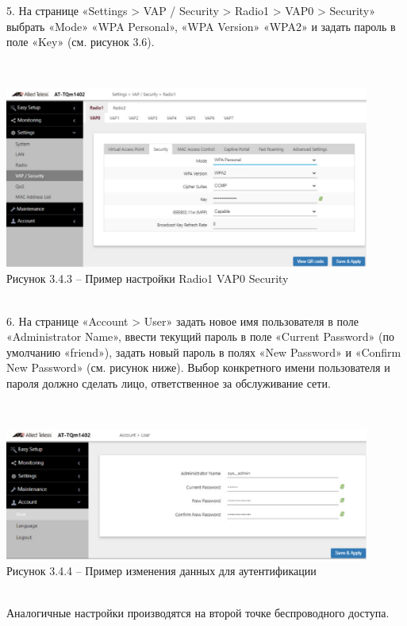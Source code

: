     5. На странице «Settings > VAP / Security > Radio1 > VAP0 > Security» выбрать «Mode» «WPA Personal»,
    «WPA Version» «WPA2» и задать пароль в поле «Key» (см. рисунок 3.6).

    \\
    \begin{center}
        \includegraphics[width=0.9\textwidth]{images/point3}\\
        Рисунок 3.4.3 – Пример настройки Radio1 VAP0 Security
    \end{center}
    \\

    6. На странице «Account > User» задать новое имя пользователя в поле «Administrator Name»,
    ввести текущий пароль в поле «Current Password» (по умолчанию «friend»),
    задать новый пароль в полях «New Password» и «Confirm New Password» (см. рисунок ниже).
    Выбор конкретного имени пользователя и пароля должно сделать лицо, ответственное за обслуживание сети.

    \\
    \begin{center}
        \includegraphics[width=0.9\textwidth]{images/point4}\\
        Рисунок 3.4.4 – Пример изменения данных для аутентификации
    \end{center}
    \\
    Аналогичные настройки производятся на второй точке беспроводного доступа.

